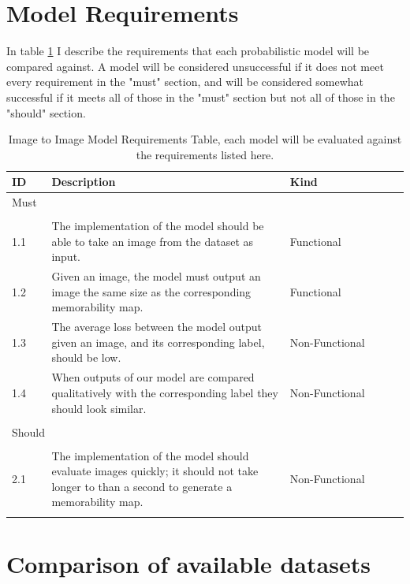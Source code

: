 \documentclass{UoYCSproject}
\begin{document}
\section{Model Requirements}

In table \ref{tab:RequirementCaptureTable} I describe the requirements that each probabilistic model will be compared against. A model will be considered unsuccessful if it does not meet every requirement in the "must" section, and will be considered somewhat successful if it meets all of those in the "must" section but not all of those in the "should" section.

\begin{table}[ht]
    \begin{tabular}{p{0.1\linewidth} p{0.6\linewidth} p{0.3\linewidth}}
    \toprule
    ID  & Description & Kind \\ \midrule
    \multicolumn{3}{l}{{Must}} \\
    \hline \\
    1.1 & The implementation of the model should be able to take an image from the dataset as input. & Functional \\
    1.2 & Given an image, the model must output an image the same size as the corresponding memorability map. & Functional \\
    1.3 & The average loss between the model output given an image, and its corresponding label, should be low. & Non-Functional \\
    1.4 & When outputs of our model are compared qualitatively with the corresponding label they should look similar. & Non-Functional \\
    \hline \\
    \multicolumn{3}{l}{{Should}} \\
    \hline \\
    2.1 & The implementation of the model should evaluate images quickly; it should not take longer to than a second to generate a memorability map. & Non-Functional \\
     &  &  \\ \bottomrule
    \end{tabular}
    \caption{Image to Image Model Requirements Table, each model will be evaluated against the requirements listed here.}
    \label{tab:RequirementCaptureTable}
\end{table}

\section{Comparison of available datasets}
\end{document}
